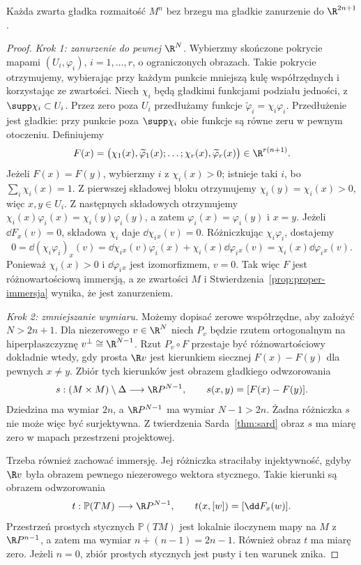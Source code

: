 \begin{twierdzenie}
\label{thm:whitney-slabe}
Każda zwarta gładka rozmaitość $M^n$ bez brzegu
ma gładkie zanurzenie do $\R^{2n+1}$.
\end{twierdzenie}
\begin{proof}
\emph{Krok 1: zanurzenie do pewnej $\R^N$.}
Wybierzmy skończone pokrycie mapami $(U_i,\varphi_i)$,
$i=1,\ldots,r$, o ograniczonych obrazach. Takie pokrycie
otrzymujemy, wybierając przy każdym punkcie mniejszą
kulę współrzędnych i korzystając ze zwartości. Niech $\chi_i$ będą gładkimi
funkcjami podziału jedności, z
$\supp\chi_i\subset U_i$. Przez zero poza $U_i$
przedłużamy funkcje
$\widetilde\varphi_i=\chi_i\varphi_i$.
Przedłużenie jest gładkie: przy punkcie poza
$\supp\chi_i$ obie funkcje są równe zeru
w pewnym otoczeniu. Definiujemy
\[
 F(x)=\bigl(\chi_1(x),\widetilde\varphi_1(x);
       \ldots;\chi_r(x),\widetilde\varphi_r(x)\bigr)
       \in\R^{r(n+1)}.
\]
Jeżeli $F(x)=F(y)$, wybierzmy $i$ z
$\chi_i(x)>0$; istnieje taki $i$, bo
$\sum_i\chi_i(x)=1$. Z pierwszej składowej
bloku otrzymujemy $\chi_i(y)=\chi_i(x)>0$,
więc $x,y\in U_i$. Z następnych składowych
otrzymujemy
$\chi_i(x)\varphi_i(x)=\chi_i(y)\varphi_i(y)$,
a zatem $\varphi_i(x)=\varphi_i(y)$ i $x=y$.
Jeżeli $\dd F_x(v)=0$, składowa $\chi_i$
daje $\dd\chi_i{}_x(v)=0$. Różniczkując
$\chi_i\varphi_i$, dostajemy
\[
 0=\dd(\chi_i\varphi_i)_x(v)
 =\dd\chi_i{}_x(v)\varphi_i(x)
       +\chi_i(x)\dd\varphi_i{}_x(v)
 =\chi_i(x)\dd\varphi_i{}_x(v).
\]
Ponieważ $\chi_i(x)>0$ i $\dd\varphi_i{}_x$
jest izomorfizmem, $v=0$. Tak więc $F$
jest różnowartościową immersją, a ze
zwartości $M$ i Stwierdzenia~\ref{prop:proper-immersja}
wynika, że jest zanurzeniem.

\emph{Krok 2: zmniejszanie wymiaru.}
Możemy dopisać zerowe współrzędne, aby
założyć $N>2n+1$. Dla niezerowego
$v\in\R^N$ niech $P_v$ będzie rzutem
ortogonalnym na hiperpłaszczyznę
$v^\perp\cong\R^{N-1}$. Rzut $P_v\circ F$
przestaje być różnowartościowy dokładnie
wtedy, gdy prosta $\R v$ jest kierunkiem
siecznej $F(x)-F(y)$ dla pewnych $x\ne y$.
Zbiór tych kierunków jest obrazem
gładkiego odwzorowania
\[
 s:(M\times M)\setminus\Delta\longrightarrow
       \R P^{N-1},\qquad
 s(x,y)=[F(x)-F(y)].
\]
Dziedzina ma wymiar $2n$, a $\R P^{N-1}$
ma wymiar $N-1>2n$. Żadna różniczka $s$
nie może więc być surjektywna.
Z twierdzenia Sarda~\ref{thm:sard} obraz
$s$ ma miarę zero w mapach przestrzeni
projektowej.

Trzeba również zachować immersję. Jej
różniczka straciłaby injektywność,
gdyby $\R v$ była obrazem pewnego
niezerowego wektora stycznego.
Takie kierunki są obrazem odwzorowania
\[
 t:\mathbb P(TM)\longrightarrow\R P^{N-1},
       \qquad t(x,[w])=[\dd F_x(w)].
\]
Przestrzeń prostych stycznych
$\mathbb P(TM)$ jest lokalnie iloczynem
mapy na $M$ z $\R P^{n-1}$, a zatem
ma wymiar $n+(n-1)=2n-1$.
Również obraz $t$ ma miarę zero.
Jeżeli $n=0$, zbiór prostych stycznych
jest pusty i ten warunek znika.


\end{proof}
